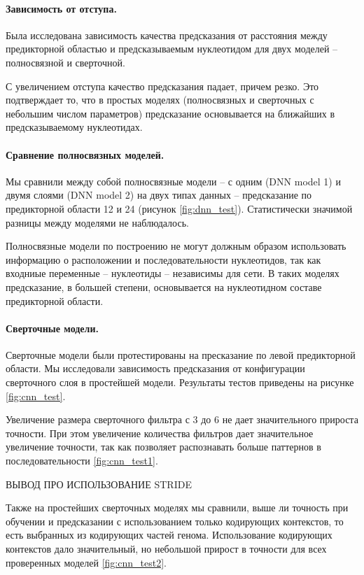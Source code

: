 \paragraph{Зависимость от отступа.} Была исследована зависимость качества предсказания от расстояния между предикторной областью и предсказываемым нуклеотидом для двух моделей -- полносвязной и сверточной. 

С увеличением отступа качество предсказания падает, причем резко. Это подтверждает то, что в простых моделях (полносвязных и сверточных с небольшим числом параметров) предсказание основывается на ближайших в предсказываемому нуклеотидах.


 
 \paragraph{Сравнение полносвязных моделей.} Мы сравнили между собой полносвязные модели -- с одним (DNN model 1) и двумя слоями (DNN model 2)  на двух типах данных -- предсказание по предикторной области 12 и 24 (рисунок \ref{fig:dnn_test}). Статистически значимой разницы между моделями не наблюдалось.
 
 Полносвязные модели по построению не могут должным образом использовать информацию о расположении и последовательности нуклеотидов, так как входниые переменные -- нуклеотиды -- независимы для сети. В таких моделях предсказание, в большей степени, основывается на нуклеотидном составе предикторной области.
 



\paragraph{Сверточные модели.} Сверточные модели были протестированы на пресказание по левой предикторной области. Мы исследовали зависимость предсказания от конфигурации сверточного слоя в простейшей модели. Результаты тестов приведены на рисунке \ref{fig:cnn_test}.

Увеличение размера сверточного фильтра с 3 до 6 не дает значительного прироста точности. При этом увеличение количества фильтров дает значительное увеличение точности, так как позволяет распознавать больше паттернов в последовательности \ref{fig:cnn_test1}.

ВЫВОД ПРО ИСПОЛЬЗОВАНИЕ STRIDE	

Также на простейших сверточных моделях мы сравнили, выше ли точность при обучении и предсказании с использованием только кодирующих контекстов, то есть выбранных из кодирующих частей генома. Использование кодирующих контекстов дало значительный, но небольшой прирост в точности для всех проверенных моделей \ref{fig:cnn_test2}. 

